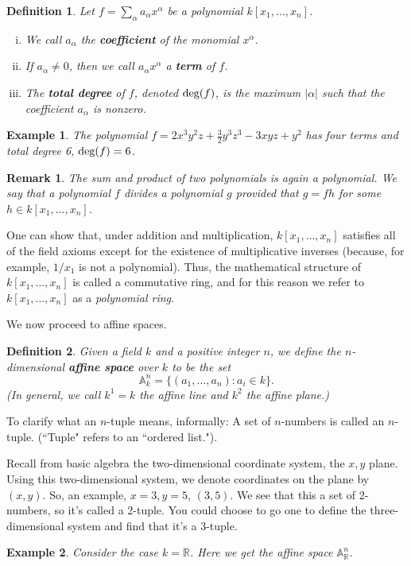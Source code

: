 \documentclass[12pt,reqno]{amsart}
\theoremstyle{plain}
\newtheorem{defi}{Definition}
\newtheorem{rem}{Remark}
\newcommand{\degg}{\textup{deg}}
\newtheorem{ex}{Example}
\newcommand{\aff}{\mathbb A}
\newcommand{\rr}{\mathbb R}
\begin{document}
\begin{defi} Let $f = \sum_{\alpha} a_{\alpha} x^{\alpha}$ be a polynomial $k \left[x_1, \ldots , x_n\right]$.
\begin{enumerate}[(i)]
\item We call $a_\alpha$ the \textup{\textbf{coefficient}} of the monomial $x^{\alpha}$.
\item If $a_\alpha \neq 0$, then we call $a_{\alpha} x^{\alpha}$ a \textup{\textbf{term}} of $f$.
\item The \textup{\textbf{total degree}} of $f$, denoted $\degg (f)$, is the maximum $| \alpha|$ such that the coefficient $a_{\alpha}$ is nonzero. 
\end{enumerate}
\end{defi}
\begin{ex} The polynomial $f= 2x^3 y^2 z + \frac{3}{2} y^3 z^3 - 3xyz +y^2$ has four terms and total degree 6, $\degg (f) = 6$. 
\end{ex}
\begin{rem} The sum and product of two polynomials is again a polynomial. We say that a polynomial $f$ \textit{divides} a polynomial $g$ provided that $g = fh$ for some $h \in k [x_1, \ldots , x_n ]$.
\end{rem}

One can show that, under addition and multiplication, $k \left[x_1, \ldots , x_n\right]$ satisfies all of the field axioms except for the existence of multiplicative inverses (because, for example, $1/x_1$ is not a polynomial). Thus, the mathematical structure of $k \left[x_1, \ldots , x_n\right]$ is called a commutative ring, and for this reason we refer to $k \left[x_1, \ldots , x_n\right]$ as a \textit{polynomial ring}. 

We now proceed to affine spaces. 
\begin{defi} Given a field $k$ and a positive integer $n$, we define the $n$-dimensional \textup{\textbf{affine space}} over $k$ to be the set $$\mathbb{A}_k^n = \{ (a_1, \ldots, a_n ) \colon a_i \in k \}.$$  (In general, we call $k^1 = k$ the \textit{affine line} and $k^2$ the \textit{affine plane}.) 
\end{defi}


To clarify what an $n$-tuple means, informally: A set of $n$-numbers is called an $n$-tuple. (``Tuple" refers to an ``ordered list."). 

Recall from basic algebra the two-dimensional coordinate system, the $x,y$ plane. Using this two-dimensional system, we denote coordinates on the plane by $(x,y)$. So, an example, $x=3, y =5$, $(3,5)$. We see that this a set of 2-numbers, so it's called a 2-tuple. You could choose to go one to define the three-dimensional system and find that it's a 3-tuple. 
\begin{ex} Consider the case $k = \rr$. Here we get the affine space $\aff_{\rr}^n$.
\end{ex} 
\end{document}
